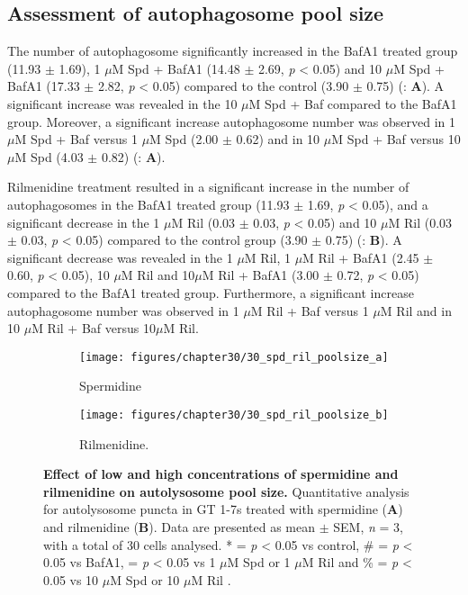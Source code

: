 \subsection{Assessment of autophagosome pool size}
The number of autophagosome significantly increased in the BafA1 treated group (11.93  $\pm$ 1.69), 1 $\mu$M Spd + BafA1 (14.48 $\pm$ 2.69, \textit{p} < 0.05) and 10 $\mu$M Spd + BafA1 (17.33 $\pm$ 2.82, \textit{p} < 0.05) compared to the control (3.90 $\pm$ 0.75) (: \textbf{A}). A significant increase was revealed in the 10 $\mu$M Spd + Baf compared to the BafA1 group. Moreover, a significant increase autophagosome number was observed in 1 $\mu$M Spd + Baf versus 1 $\mu$M Spd (2.00 $\pm$ 0.62) and in 10 $\mu$M Spd + Baf versus 10 $\mu$M Spd (4.03 $\pm$ 0.82) (: \textbf{A}).

Rilmenidine treatment resulted in a significant increase in the number of autophagosomes in the BafA1 treated group (11.93 $\pm$ 1.69, \textit{p} < 0.05), and a significant decrease in the 1 $\mu$M Ril (0.03 $\pm$ 0.03, \textit{p} < 0.05) and 10 $\mu$M Ril (0.03 $\pm$ 0.03, \textit{p} < 0.05) compared to the control group (3.90 $\pm$ 0.75) (: \textbf{B}). A significant decrease was revealed in the 1 $\mu$M Ril, 1 $\mu$M Ril + BafA1 (2.45 $\pm$ 0.60, \textit{p} < 0.05), 10 $\mu$M Ril and 10$\mu$M Ril + BafA1 (3.00 $\pm$ 0.72, \textit{p} < 0.05) compared to the BafA1 treated group. Furthermore, a significant increase autophagosome number was observed in 1 $\mu$M Ril + Baf versus 1 $\mu$M Ril and in 10 $\mu$M Ril + Baf versus 10$\mu$M Ril.

\begin{figure}[!htbp]
  \begin{subfigure}[b]{0.495\linewidth}
    \texttt{[image: figures/chapter30/30\_spd\_ril\_poolsize\_a]}
    \caption{Spermidine}
  \end{subfigure}
  \begin{subfigure}[b]{0.495\linewidth}
    \texttt{[image: figures/chapter30/30\_spd\_ril\_poolsize\_b]}
    \caption{Rilmenidine.}
  \end{subfigure}
  \caption[Effect of low and high concentrations of spermidine and rilmenidine on autolysosome pool size]{\textbf{Effect of low and high concentrations of spermidine and rilmenidine on autolysosome pool size.} Quantitative analysis for autolysosome puncta in GT 1-7s treated with spermidine (\textbf{A}) and rilmenidine (\textbf{B}). Data are presented as mean $\pm$ SEM, \textit{n} = 3, with a total of 30 cells analysed. * = \textit{p} < 0.05 vs control, \# = \textit{p} < 0.05 vs BafA1, \@ = \textit{p} < 0.05 vs 1 $\mu$M Spd or 1 $\mu$M Ril and \% = \textit{p} < 0.05 vs 10 $\mu$M Spd or 10 $\mu$M Ril .}
  \label{fig:30_spd_ril_poolsize1}
\end{figure}

